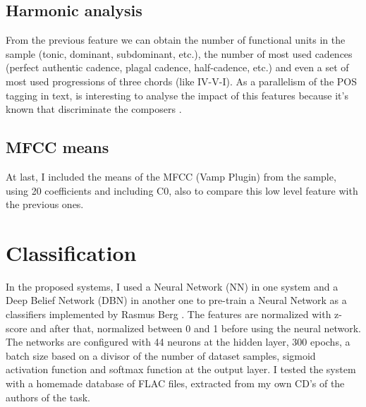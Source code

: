 \documentclass[a4paper,openany,oneside,12pt]{book}
\begin{document}
\subsection{Harmonic analysis}\label{subsec:uni_bi_tri}

From the previous feature we can obtain the number of functional units in the sample (tonic, dominant, subdominant, etc.), the number of most used cadences (perfect authentic cadence, plagal cadence, half-cadence, etc.) and even a set of most used progressions of three chords (like IV-V-I). As a parallelism of the POS tagging in text, is interesting to analyse the impact of this features because it's known that discriminate the composers \cite{desportes}.

\subsection{MFCC means}\label{subsec:mfcc_means}
At last, I included the means of the MFCC (Vamp Plugin) from the sample, using 20 coefficients and including C0, also to compare this low level feature with the previous ones.


\section{Classification}\label{sec:classification}

In the proposed systems, I used a Neural Network (NN) in one system and a Deep Belief Network (DBN) in another one to pre-train a Neural Network as a classifiers implemented by Rasmus Berg \cite{IMM2012-06284}. The features are normalized with z-score and after that, normalized between 0 and 1 before using the neural network. The networks are configured with 44 neurons at the hidden layer, 300 epochs, a batch size based on a divisor of the number of dataset samples, sigmoid activation function and softmax function at the output layer. I tested the system with a homemade database of FLAC files, extracted from my own CD's of the authors of the task.
\end{document}

